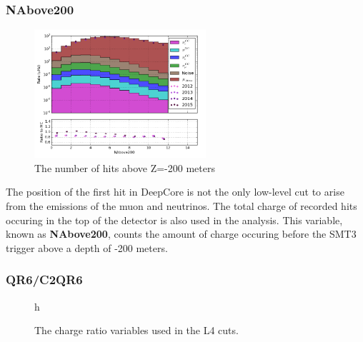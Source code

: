 \subsubsection{NAbove200}
\begin{figure}[h]
	\centering
		\includegraphics[width=2.5in]{NAbove200_log.png}
		\caption[Number of Hits Above Z=-200]{The number of hits above Z=-200 meters}
	\label{fig:nabove200_log}
\end{figure}

The position of the first hit in DeepCore is not the only low-level cut to arise from the emissions of the muon and neutrinos. 
The total charge of recorded hits occuring in the top of the detector is also used in the analysis. 
This variable, known as \textbf{NAbove200}, counts the amount of charge occuring before the SMT3 trigger above a depth of -200 meters.

\subsubsection{QR6/C2QR6}
\begin{figure}{h}%
	\centering
	\caption[QR6 and C2QR6]{The charge ratio variables used in the L4 cuts.}%
	\label{fig:QR6_and_C2QR6}%
\end{figure}

